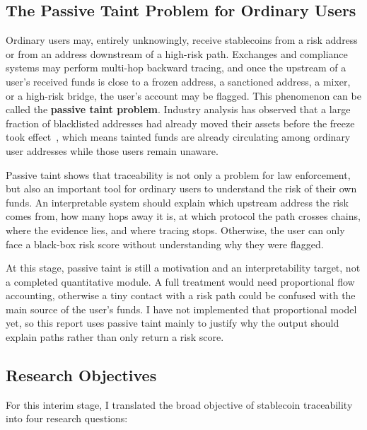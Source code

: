 \documentclass[12pt,a4paper]{article}
\begin{document}
\subsection{The Passive Taint Problem for Ordinary Users}

Ordinary users may, entirely unknowingly, receive stablecoins from a risk address or from an address downstream of a high-risk path. Exchanges and compliance systems may perform multi-hop backward tracing, and once the upstream of a user's received funds is close to a frozen address, a sanctioned address, a mixer, or a high-risk bridge, the user's account may be flagged. This phenomenon can be called the \textbf{passive taint problem}. Industry analysis has observed that a large fraction of blacklisted addresses had already moved their assets before the freeze took effect~\cite{blocksec2023}, which means tainted funds are already circulating among ordinary user addresses while those users remain unaware.

Passive taint shows that traceability is not only a problem for law enforcement, but also an important tool for ordinary users to understand the risk of their own funds. An interpretable system should explain which upstream address the risk comes from, how many hops away it is, at which protocol the path crosses chains, where the evidence lies, and where tracing stops. Otherwise, the user can only face a black-box risk score without understanding why they were flagged.

At this stage, passive taint is still a motivation and an interpretability target, not a completed quantitative module. A full treatment would need proportional flow accounting, otherwise a tiny contact with a risk path could be confused with the main source of the user's funds. I have not implemented that proportional model yet, so this report uses passive taint mainly to justify why the output should explain paths rather than only return a risk score.

\subsection{Research Objectives}

For this interim stage, I translated the broad objective of stablecoin traceability into four research questions:
\end{document}
